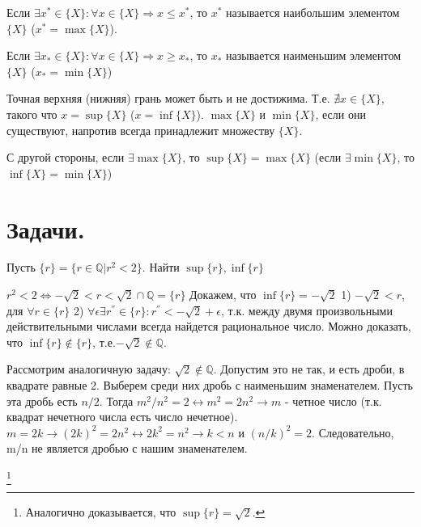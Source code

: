 \documentclass[10pt]{article}
\begin{document}
\begin{definition}

Если $\exists x^* \in \{X\}: \forall x\in\{X\} \Longrightarrow x \leqslant x^*$, то $x^*$ называется наибольшим элементом $\{X\}$  ($x^*\!=\max\{X\}$).

Если $\exists x_* \in \{X\}: \forall x\in\{X\} \Longrightarrow x \geqslant x_*$, то $x_*$ называется наименьшим элементом $\{X\}$  ($x_*\!=\min\{X\}$)

\end{definition}

\begin{remark}
Точная верхняя (нижняя) грань может быть и не достижима. Т.е. $\nexists x \in \{X\}$, такого что $x\!=\sup\{X\}$ ($x\!=\inf\{X\}$). $\max \{X\}$ и $\min\{X\}$, если они существуют, напротив всегда принадлежит множеству $ \{X\}$.


С другой стороны, если $\exists \max\{X\}$, то $\sup\{X\}\!=\max\{X\}$ (если $\exists \min\{X\}$, то $\inf\{X\}\!=\min\{X\}$)
\end{remark}


\section[Задачи]{Задачи.}\label{sec:problems_9}

\begin{problem}
\emph{} Пусть $\{r\}=\{r \in \mathbb{Q}  |  r^2<2\}$. Найти $\sup\{r\},\inf\{r\}$

\end{problem}
\begin{solution}
 $r^2<2 \Longleftrightarrow {-\sqrt 2<r<\sqrt 2} \cap \mathbb{Q} = \{r\} $ \newline
Докажем, что $\inf\{r\}=-\sqrt2$ 1) $-\sqrt2<r$, для $\forall r \in \{r\}$
2) $\forall \epsilon \exists r^{''} \in \{r\}: r^{''} < -\sqrt 2 + \epsilon $, т.к. между двумя произвольными действительными числами всегда найдется рациональное число. Можно доказать, что $\inf\{r\} \notin \{r\}$, т.е.$ -\sqrt2 \notin \mathbb{Q}$.

\medskip

 Рассмотрим аналогичную задачу: $\sqrt2 \notin \mathbb{Q}$. Допустим это не так, и есть дроби, в квадрате равные 2. Выберем среди них дробь с наименьшим знаменателем. Пусть эта дробь есть $n/2$. Тогда $m^2/n^2=2 \leftrightarrow m^2=2n^2 \rightarrow m$ - четное число (т.к. квадрат нечетного числа есть число нечетное). $m=2k \rightarrow (2k)^2=2n^2 \leftrightarrow 2k^2=n^2 \rightarrow k<n$ и $(n/k)^2=2.$ Следовательно, m/n не является дробью с нашим знаменателем.

\footnote{ Аналогично доказывается, что $\sup\{r\}=\sqrt2.$}



\end{solution}
\end{document}
